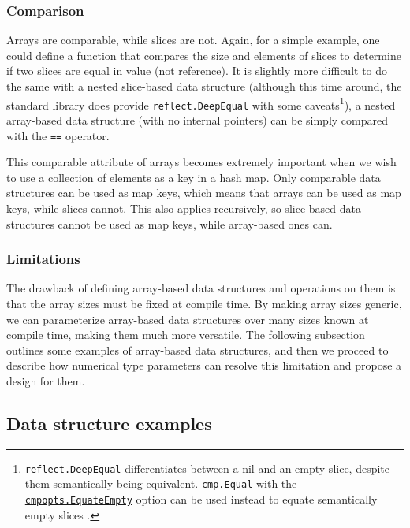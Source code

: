 \subsubsection{Comparison}

Arrays are comparable, while slices are not. Again, for a simple example, one
could define a function that compares the size and elements of slices to
determine if two slices are equal in value (not reference). It is slightly more
difficult to do the same with a nested slice-based data structure (although this
time around, the standard library does provide \texttt{reflect.DeepEqual} with
some caveats\footnote{\href{https://pkg.go.dev/reflect\#DeepEqual}{\texttt{reflect.DeepEqual}} differentiates between a nil
	and an empty slice, despite them semantically being equivalent.
	\href{https://pkg.go.dev/github.com/google/go-cmp/cmp\#Equal}{\texttt{cmp.Equal}}
	with the
	\href{https://pkg.go.dev/github.com/google/go-cmp/cmp/cmpopts\#EquateEmpty}{\texttt{cmpopts.EquateEmpty}}
	option can be used instead to equate semantically empty slices
	\autocite{deepEqual}.}), a nested array-based data structure (with no internal
pointers) can be simply compared with the \texttt{==} operator.

This comparable attribute of arrays becomes extremely important when we wish to
use a collection of elements as a key in a hash map. Only comparable data
structures can be used as map keys, which means that arrays can be used as map
keys, while slices cannot. This also applies recursively, so slice-based data
structures cannot be used as map keys, while array-based ones can.

\subsubsection{Limitations}

The drawback of defining array-based data structures and operations on them is
that the array sizes must be fixed at compile time. By making array sizes
generic, we can parameterize array-based data structures over many sizes known
at compile time, making them much more versatile. The following subsection
outlines some examples of array-based data structures, and then we proceed to
describe how numerical type parameters can resolve this limitation and propose a
design for them.

\subsection{Data structure examples}

